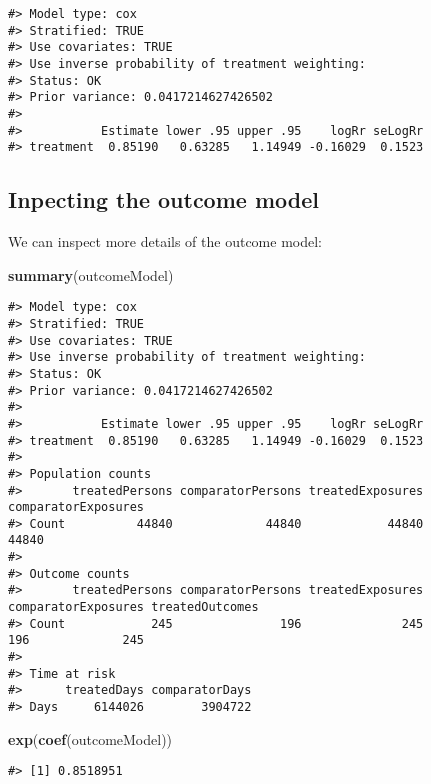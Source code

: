 \documentclass[]{article}
\newenvironment{Shaded}{\begin{snugshade}}{\end{snugshade}}
\newcommand{\KeywordTok}[1]{\textcolor[rgb]{0.13,0.29,0.53}{\textbf{#1}}}
\newcommand{\NormalTok}[1]{#1}
\begin{document}
\begin{verbatim}
#> Model type: cox
#> Stratified: TRUE
#> Use covariates: TRUE
#> Use inverse probability of treatment weighting: 
#> Status: OK
#> Prior variance: 0.0417214627426502
#> 
#>           Estimate lower .95 upper .95    logRr seLogRr
#> treatment  0.85190   0.63285   1.14949 -0.16029  0.1523
\end{verbatim}

\hypertarget{inpecting-the-outcome-model}{%
\subsection{Inpecting the outcome
model}\label{inpecting-the-outcome-model}}

We can inspect more details of the outcome model:

\begin{Shaded}
\begin{Highlighting}[]
\KeywordTok{summary}\NormalTok{(outcomeModel)}
\end{Highlighting}
\end{Shaded}

\begin{verbatim}
#> Model type: cox
#> Stratified: TRUE
#> Use covariates: TRUE
#> Use inverse probability of treatment weighting: 
#> Status: OK
#> Prior variance: 0.0417214627426502
#> 
#>           Estimate lower .95 upper .95    logRr seLogRr
#> treatment  0.85190   0.63285   1.14949 -0.16029  0.1523
#> 
#> Population counts
#>       treatedPersons comparatorPersons treatedExposures comparatorExposures
#> Count          44840             44840            44840               44840
#> 
#> Outcome counts
#>       treatedPersons comparatorPersons treatedExposures comparatorExposures treatedOutcomes
#> Count            245               196              245                 196             245
#> 
#> Time at risk
#>      treatedDays comparatorDays
#> Days     6144026        3904722
\end{verbatim}

\begin{Shaded}
\begin{Highlighting}[]
\KeywordTok{exp}\NormalTok{(}\KeywordTok{coef}\NormalTok{(outcomeModel))}
\end{Highlighting}
\end{Shaded}

\begin{verbatim}
#> [1] 0.8518951
\end{verbatim}
\end{document}
